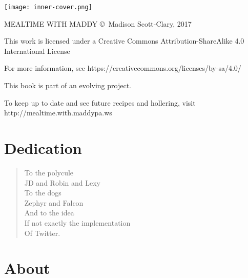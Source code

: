 \documentclass{memoir}
\begin{document}
\frontmatter

\pagestyle{empty}
\texttt{[image: inner-cover.png]}
\newpage

\null
\vfill

\titlefont MEALTIME WITH MADDY \copyright\ Madison Scott-Clary, 2017

\vspace{1ex}

This work is licensed under a Creative Commons Attribution-ShareAlike 4.0 International License

\vspace{1ex}

For more information, see \mbox{\urlfont https://creativecommons.org/licenses/by-sa/4.0/}

\vspace{1cm}

This book is part of an evolving project.

To keep up to date and see future recipes and hollering, visit \mbox{\urlfont http://mealtime.with.maddypa.ws}

\vfill
\newpage

\pagestyle{fancyplain}
\tableofcontents*

\normalfont

\chapter*{Dedication}

\begin{verse}
  To the polycule\\
  \vin JD and Robin and Lexy\\
  To the dogs\\
  \vin Zephyr and Falcon\\
  And to the idea\\
  \vin If not exactly the implementation\\
  \vin \vin Of Twitter.
\end{verse}

\chapter[About]{About}

\mainmatter






\end{document}
